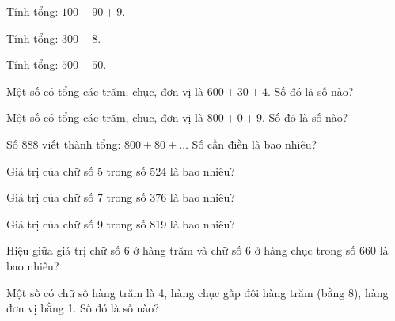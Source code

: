 \begin{ex}
Tính tổng: $100 + 90 + 9$.
\end{ex}

\begin{ex}
Tính tổng: $300 + 8$.
\end{ex}

\begin{ex}
Tính tổng: $500 + 50$.
\end{ex}

\begin{ex}
Một số có tổng các trăm, chục, đơn vị là $600 + 30 + 4$. Số đó là số nào?
\end{ex}

\begin{ex}
Một số có tổng các trăm, chục, đơn vị là $800 + 0 + 9$. Số đó là số nào?
\end{ex}

\begin{ex}
Số 888 viết thành tổng: $800 + 80 + \dots$ Số cần điền là bao nhiêu?
\end{ex}

\begin{ex}
Giá trị của chữ số 5 trong số 524 là bao nhiêu?
\end{ex}

\begin{ex}
Giá trị của chữ số 7 trong số 376 là bao nhiêu?
\end{ex}

\begin{ex}
Giá trị của chữ số 9 trong số 819 là bao nhiêu?
\end{ex}

\begin{ex}
Hiệu giữa giá trị chữ số 6 ở hàng trăm và chữ số 6 ở hàng chục trong số 660 là bao nhiêu?
\end{ex}

\begin{ex}
Một số có chữ số hàng trăm là 4, hàng chục gấp đôi hàng trăm (bằng 8), hàng đơn vị bằng 1. Số đó là số nào?
\end{ex}

